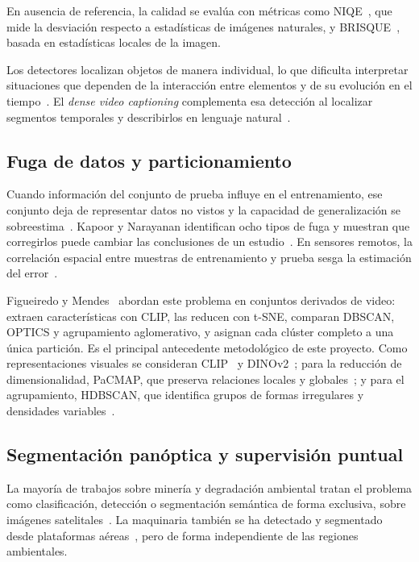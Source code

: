En ausencia de referencia, la calidad se evalúa con métricas como NIQE~\cite{mittal2013making}, que mide la desviación respecto a estadísticas de imágenes naturales, y BRISQUE~\cite{mittal2012noreference}, basada en estadísticas locales de la imagen.

Los detectores localizan objetos de manera individual, lo que dificulta interpretar situaciones que dependen de la interacción entre elementos y de su evolución en el tiempo~\cite{cong2021spatialtemporal,wang2023context}. El \textit{dense video captioning} complementa esa detección al localizar segmentos temporales y describirlos en lenguaje natural~\cite{mkhallati2023soccernet,yang2023vid2seq,muksimova2025crossmodal}.

\subsection{Fuga de datos y particionamiento}
Cuando información del conjunto de prueba influye en el entrenamiento, ese conjunto deja de representar datos no vistos y la capacidad de generalización se sobreestima~\cite{sasse2025leakage}. Kapoor y Narayanan identifican ocho tipos de fuga y muestran que corregirlos puede cambiar las conclusiones de un estudio~\cite{kapoor2023leakage}. En sensores remotos, la correlación espacial entre muestras de entrenamiento y prueba sesga la estimación del error~\cite{hansch2017correct}.

Figueiredo y Mendes~\cite{figueiredo2024leakage} abordan este problema en conjuntos derivados de video: extraen características con CLIP, las reducen con t-SNE, comparan DBSCAN, OPTICS y agrupamiento aglomerativo, y asignan cada clúster completo a una única partición. Es el principal antecedente metodológico de este proyecto. Como representaciones visuales se consideran CLIP~\cite{radford2021clip} y DINOv2~\cite{oquab2024dinov2}; para la reducción de dimensionalidad, PaCMAP, que preserva relaciones locales y globales~\cite{wang2021pacmap}; y para el agrupamiento, HDBSCAN, que identifica grupos de formas irregulares y densidades variables~\cite{mcinnes2017hdbscan,glazner2025findleak}.

\subsection{Segmentación panóptica y supervisión puntual}
La mayoría de trabajos sobre minería y degradación ambiental tratan el problema como clasificación, detección o segmentación semántica de forma exclusiva, sobre imágenes satelitales~\cite{balaniuk2020mining,camalan2022change,deandrade2022deforestation,lemesneto2026sar}. La maquinaria también se ha detectado y segmentado desde plataformas aéreas~\cite{ersoz2024aidcon,liu2026lightweight}, pero de forma independiente de las regiones ambientales.

